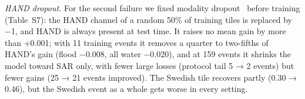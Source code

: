 \emph{HAND dropout.} For the second failure we fixed modality dropout~\cite{neverova2016moddrop} before
training (Table~S7): the HAND channel of a random 50\% of training tiles is replaced by −1, and HAND is
always present at test time. It raises no mean gain by more than +0.001; with 11 training events it removes
a quarter to two-fifths of HAND's gain (flood −0.008, all water −0.020), and at 159 events it shrinks the
model toward SAR only, with fewer large losses (protocol tail 5 → 2 events) but fewer gains (25 → 21 events
improved). The Swedish tile recovers partly (0.30 → 0.46), but the Swedish event as a whole gets worse in
every setting.
